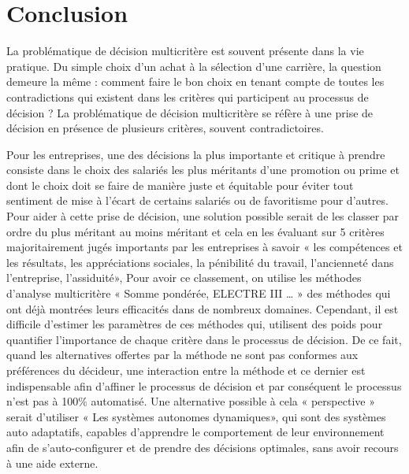 \chapter*{Conclusion}


La problématique de décision multicritère est souvent présente dans la vie pratique. Du simple choix d’un achat à la sélection d’une carrière, la question demeure la même : comment faire le bon choix en tenant compte de toutes les contradictions qui existent dans les critères qui participent au processus de décision ? La problématique de décision multicritère se réfère à une prise de décision en présence de plusieurs critères, souvent contradictoires.
\vspace{5mm}

Pour les entreprises, une des décisions la plus importante et critique à prendre consiste dans le choix des salariés les plus méritants d’une promotion ou prime et dont le choix doit se faire de manière juste et équitable pour éviter tout sentiment de mise à l’écart de certains salariés ou de favoritisme pour d’autres. Pour aider à cette prise de décision, une solution possible serait de les classer par ordre du plus méritant au moins méritant et cela en les évaluant sur 5 critères majoritairement jugés importants par les entreprises à savoir « les compétences et les résultats, les appréciations sociales, la pénibilité du travail, l’ancienneté dans l’entreprise, l’assiduité», Pour avoir ce classement, on utilise les méthodes d’analyse multicritère « Somme pondérée, ELECTRE III … » des méthodes qui ont déjà montrées leurs efficacités dans de nombreux domaines. Cependant, il est difficile d’estimer les paramètres de ces méthodes qui, utilisent des poids pour quantifier l’importance de chaque critère dans le processus de décision. De ce fait, quand les alternatives offertes par la méthode ne sont pas conformes aux préférences du décideur, une interaction entre la méthode et ce dernier est indispensable afin d’affiner le processus de décision et par conséquent  le processus n’est pas à 100\% automatisé. Une alternative possible à cela « perspective » serait d’utiliser « Les systèmes autonomes dynamiques», qui sont des systèmes auto adaptatifs, capables d’apprendre le comportement de leur environnement afin de s’auto-configurer et de prendre des décisions optimales, sans avoir recours à une aide externe.

